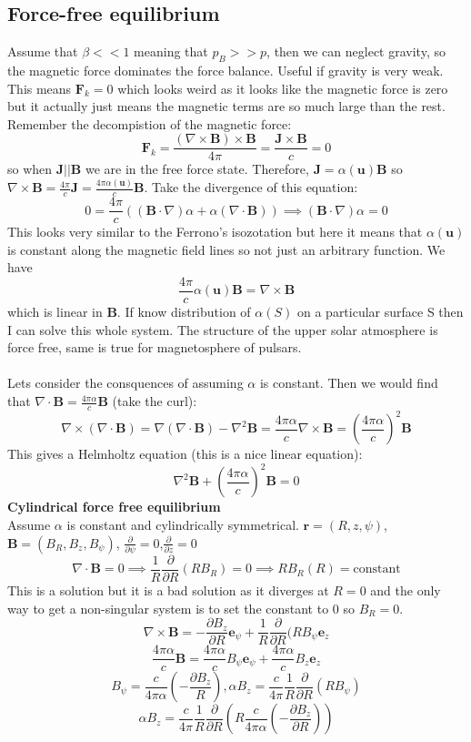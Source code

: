 \documentclass{article}
\begin{document}
\subsection{Force-free equilibrium}
Assume that $\beta <<1$ meaning that $p_B >> p$, then we can neglect gravity, so the magnetic force dominates the force balance. Useful if gravity is very weak. This means $\bm F_k = 0$ which looks weird as it looks like the magnetic force is zero but it actually just means the magnetic terms are so much large than the rest. Remember the decompistion of the magnetic force:
$$
\bm F_k = \frac{(\nabla \times \bm B) \times \bm B}{4 \pi} = \frac{\bm J \times \bm B}{c} = 0
$$
so when $\bm J || \bm B$ we are in the free force state. Therefore, $\bm J = \alpha(\bm u)\bm B$ so $\nabla \times \bm B = \frac{4\pi}{c} \bm J = \frac{4 \pi \alpha(\bm u) }{c} \bm B$.
Take the divergence of this equation:
$$
0 = \frac{4\pi}{c}\left( ( \bm B \cdot \nabla) \alpha + \alpha (\nabla \cdot \bm B) \right) \implies (\bm B \cdot \nabla) \alpha = 0
$$
This looks very similar to the Ferrono's isozotation but here it means that $\alpha(\bm u)$ is constant along the magnetic field lines so not just an arbitrary function. We have
$$
\frac{4\pi}{c} \alpha(\bm u) \bm B = \nabla \times \bm B 
$$
which is linear in $\bm B$. If know distribution of $\alpha(S)$ on a particular surface S then I can solve this whole system. The structure of the upper solar atmosphere is force free, same is true for magnetosphere of pulsars. \\\\
Lets consider the consquences of assuming $\alpha$ is constant. Then we would find that $\nabla \cdot \bm B = \frac{4\pi \alpha}{c} \bm B$ (take the curl):
$$
\nabla \times(\nabla \cdot \bm B) = \nabla(\nabla \cdot \bm B) - \nabla^2 \bm B = \frac{4\pi \alpha}{c} \nabla \times \bm B = (\frac{4\pi \alpha}{c}) ^2\bm B 
$$
This gives a Helmholtz equation (this is a nice linear equation):
$$
\nabla^2 \bm B +  (\frac{4\pi \alpha}{c}) ^2\bm B = 0
$$
\textbf{Cylindrical force free equilibrium}\\
Assume $\alpha$ is constant and cylindrically symmetrical. $\bm r = ( R, z, \psi)$, $\bm B = (B_R, B_z, B_{\psi})$, $\frac{\partial}{\partial \psi} = 0$,$\frac{\partial}{\partial z} = 0$
$$
\nabla \cdot \bm B = 0 \implies \frac{1}{R}\frac{\partial}{\partial R} (R B_R) = 0 \implies RB_R(R) = \text{constant}
$$
This is a solution but it is a bad solution as it diverges at $R=0$ and the only way to get a non-singular system is to set the constant to 0 so $B_R =0$.\\
$$
\nabla \times \bm B = -\frac{\partial B_z}{\partial R}\bm e_{\psi} + \frac{1}{R} \frac{\partial}{\partial R}(RB_{\psi} \bm e_z
$$
$$
\frac{4\pi\alpha}{c}\bm B = \frac{4\pi\alpha}{c}B_{\psi}\bm e_{\psi} + \frac{4\pi\alpha}{c}B_z \bm e_z
$$
$$
B_{\psi} = \frac{c}{4\pi \alpha}(-\frac{\partial B_z}{R}), \alpha B_z = \frac{c}{4\pi} \frac{1}{R} \frac{\partial}{\partial R} (R B_{\psi})
$$
$$
\alpha B_z = \frac{c}{4\pi} \frac{1}{R} \frac{\partial}{\partial R} \left( R \frac{c}{4\pi \alpha} (-\frac{\partial B_z}{\partial R}) \right)
$$
\end{document}
